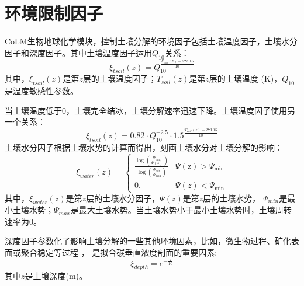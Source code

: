 \section{环境限制因子}\label{环境限制因子}
CoLM生物地球化学模块，控制土壤分解的环境因子包括土壤温度因子，土壤水分因子和深度因子。其中土壤温度因子运用$Q_{10}$关系：
\begin{equation}
\xi_{t s o i l}(z)=Q_{10}^{\frac{T_{{soil }}(z)-273.15}{10}}
\end{equation}
其中，$\xi_{tsoil}\left(z\right)$是第$z$层的土壤温度因子；$T_{soil}\left(z\right)$是第$z$层的土壤温度 (K)，$Q_{10}$是温度敏感性参数。


当土壤温度低于0\textcelsius，土壤完全结冰，土壤分解速率迅速下降。土壤温度因子使用另一个关系：
\begin{equation}
\xi_{t s o i l}(z)=0.82 \cdot Q_{10}^{-2.5} \cdot 1.5^{\frac{T_{{soil }}(z)-273.15}{10}}
\end{equation}
土壤水分因子根据土壤水势的计算而得出，刻画土壤水分对土壤分解的影响：
\begin{equation}
\xi_{w a t e r}(z)=\left\{\begin{array}{ll}\frac{\log \left(\frac{\Psi_{\min }}{\Psi(z)}\right)}{\log \left(\frac{\Psi_{\min }}{\Psi_{\max }}\right)} 
    & \Psi(\mathrm{z})>\Psi_{\min } \\ 0 . & \Psi(z)<\Psi_{\min }\end{array}\right.
\end{equation}
其中，$\xi_{water}\left(z\right)$是第$z$层的土壤水分因子，$\Psi\left(z\right)$是第$z$层的土壤水势，
$\Psi_{min}$是最小土壤水势；$\Psi_{max}$是最大土壤水势。当土壤水势小于最小土壤水势时，土壤周转速率为0。


深度因子参数化了影响土壤分解的一些其他环境因素，比如，微生物过程、矿化表面或聚合稳定等过程 \citep{koven2013effect}，
是拟合碳垂直浓度剖面的重要因素\citep{jenkinson2008turnover}:
\begin{equation}
\xi_{d e p t h}=e^{-\frac{z}{10}}
\end{equation}
其中$z$是土壤深度(m)。

